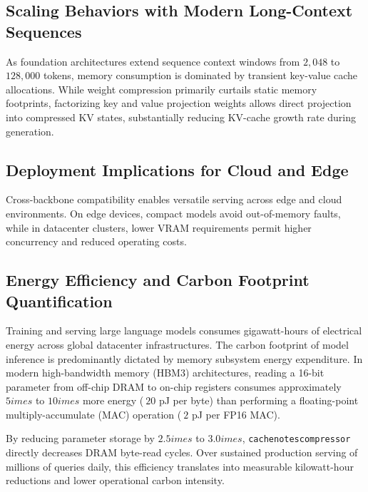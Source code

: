 \subsection{Scaling Behaviors with Modern Long-Context Sequences}
As foundation architectures extend sequence context windows from $2{,}048$ to $128{,}000$ tokens, memory consumption is dominated by transient key-value cache allocations. While weight compression primarily curtails static memory footprints, factorizing key and value projection weights allows direct projection into compressed KV states, substantially reducing KV-cache growth rate during generation.

\subsection{Deployment Implications for Cloud and Edge}
Cross-backbone compatibility enables versatile serving across edge and cloud environments. On edge devices, compact models avoid out-of-memory faults, while in datacenter clusters, lower VRAM requirements permit higher concurrency and reduced operating costs.

\subsection{Energy Efficiency and Carbon Footprint Quantification}
Training and serving large language models consumes gigawatt-hours of electrical energy across global datacenter infrastructures. The carbon footprint of model inference is predominantly dictated by memory subsystem energy expenditure. In modern high-bandwidth memory (HBM3) architectures, reading a 16-bit parameter from off-chip DRAM to on-chip registers consumes approximately $5	imes$ to $10	imes$ more energy ($~20$ pJ per byte) than performing a floating-point multiply-accumulate (MAC) operation ($~2$ pJ per FP16 MAC).

By reducing parameter storage by $2.5	imes$ to $3.0	imes$, \texttt{cachenotescompressor} directly decreases DRAM byte-read cycles. Over sustained production serving of millions of queries daily, this efficiency translates into measurable kilowatt-hour reductions and lower operational carbon intensity.
